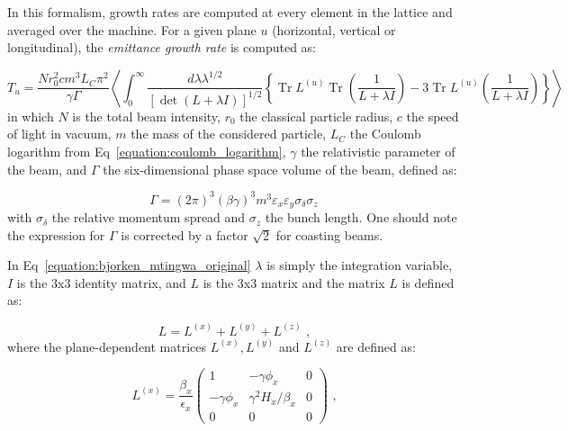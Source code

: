 In this formalism, growth rates are computed at every element in the lattice and averaged over the machine.
For a given plane \(u\) (horizontal, vertical or longitudinal), the \textit{emittance growth rate} is computed as:

\begin{equation}
    T_u = \frac{N r_0^{2} c m^3 L_C \pi^{2}}{\gamma \Gamma} \left\langle \int_0^{\infty} \frac{d \lambda \lambda^{1 / 2}}{\left[\operatorname{det}(L + \lambda I)\right]^{1/2}} \left\{\operatorname{Tr} L^{(u)} \operatorname{Tr}\left(\frac{1}{L + \lambda I}\right) - 3 \operatorname{Tr} L^{(u)} \left(\frac{1}{L + \lambda I}\right)\right\}\right\rangle
    \label{equation:bjorken_mtingwa_original}
\end{equation}
in which \(N\) is the total beam intensity, \(r_0\) the classical particle radius, \(c\) the speed of light in vacuum, \(m\) the mass of the considered particle, \(L_C\) the Coulomb logarithm from Eq~\eqref{equation:coulomb_logarithm}, \(\gamma\) the relativistic parameter of the beam, and \(\Gamma\) the six-dimensional phase space volume of the beam, defined as:

\begin{equation}
    \Gamma = \left( 2 \pi \right)^3 \left( \beta \gamma \right)^3 m^3 \varepsilon_x \varepsilon_y \sigma_{\delta} \sigma_z
\end{equation}
with \(\sigma_{\delta}\) the relative momentum spread and \(\sigma_z\) the bunch length.
One should note the expression for \(\Gamma\) is corrected by a factor \(\sqrt{2}\) for coasting beams.

In Eq~\eqref{equation:bjorken_mtingwa_original} \(\lambda\) is simply the integration variable, \(I\) is the 3x3 identity matrix, and \(L\) is the 3x3 matrix and the matrix \(L\) is defined as:

\begin{equation}
    L = L^{(x)} + L^{(y)} + L^{(z)} \text{ ,}
\end{equation}
where the plane-dependent matrices \(L^{(x)}, L^{(y)}\) and \(L^{(z)}\) are defined as:

\begin{equation}
    L^{(x)} = \frac{\beta_x}{\epsilon_x} \left(
        \begin{array}{ccc}
            1              & -\gamma \phi_x         & 0 \\
            -\gamma \phi_x & \gamma^2 H_x / \beta_x & 0 \\
            0              & 0                      & 0
        \end{array} \right) \text{ ,}
\end{equation}

